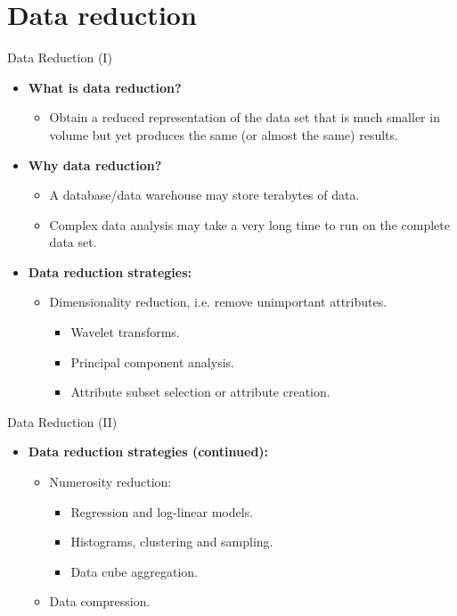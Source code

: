 \section{Data reduction}

\begin{frame}{Data Reduction (I)}
	\begin{itemize}
		\item \textbf{What is data reduction?}\\
		\begin{itemize}
			\item Obtain a reduced representation of the data set that is much 
			smaller in volume but yet produces the same (or almost the same)  
			results.
		\end{itemize}
		\item \textbf{Why data reduction?}\\
		\begin{itemize}
			\item A database/data warehouse may store terabytes of data.
			\item Complex data analysis may take a very long time to run on the 
			complete data set.
		\end{itemize}
		\item \textbf{Data reduction strategies:}
		\begin{itemize}
			\item Dimensionality reduction, i.e. remove unimportant attributes.
			\begin{itemize}
				\item Wavelet transforms.
				\item Principal component analysis.
				\item Attribute subset selection or attribute creation.
			\end{itemize}
		\end{itemize}
	\end{itemize}
\end{frame}

\begin{frame}{Data Reduction (II)}
	\begin{itemize}
		\item \textbf{Data reduction strategies (continued):}
		\begin{itemize}
			\item Numerosity reduction:
			\begin{itemize}
				\item Regression and log-linear models.
				\item Histograms, clustering and sampling.
				\item Data cube aggregation.
			\end{itemize}
			\item Data compression.
		\end{itemize}
	\end{itemize}
\end{frame}

